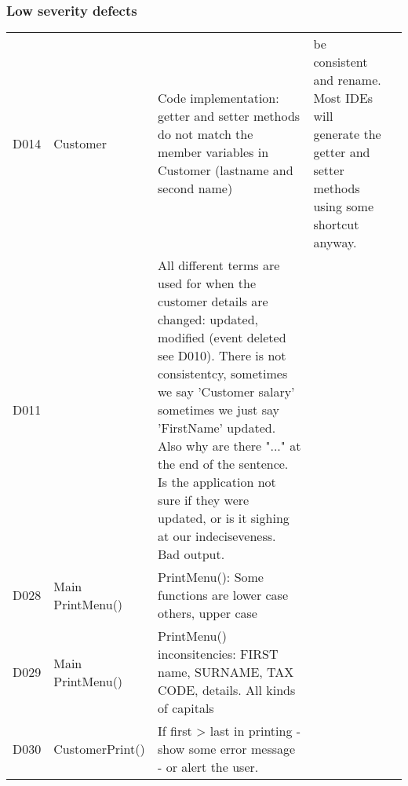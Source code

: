 \subsubsection{Low severity defects}
\begin{table}[H]
\footnotesize 
\begin{tabularx}{\textwidth}{| c | P | X | X | P |}
\hline %
 &  &  &  &  \\
\hline %
D014 
& Customer 
& Code implementation: getter and setter methods do not match the member variables in Customer (lastname and second name)  
& be consistent and rename. Most IDEs will generate the getter and setter methods using some shortcut anyway.  
& \\
\hline %
D011 
&  
& All different terms are used for when the customer details are changed: updated, modified (event deleted see D010).  There is not consistentcy, sometimes we say 'Customer salary' sometimes we just say 'FirstName' updated.  Also why are there "..." at the end of the sentence.  Is the application not sure if they were updated, or is it sighing at our indeciseveness. Bad output. 
&  
& \\
\hline %
D028 
& Main \linebreak PrintMenu()
& PrintMenu(): Some functions are lower case others, upper case 
&  
& \\
\hline %
D029 
& Main \linebreak PrintMenu()
& PrintMenu() inconsitencies: FIRST name, SURNAME, TAX CODE, details. All kinds of capitals  
&  
& \\
\hline %
D030 
& CustomerPrint() 
& If first  > last in printing - show some error message - or alert the user.  
&  
& \\
\hline %

\end{tabularx}
\end{table}
